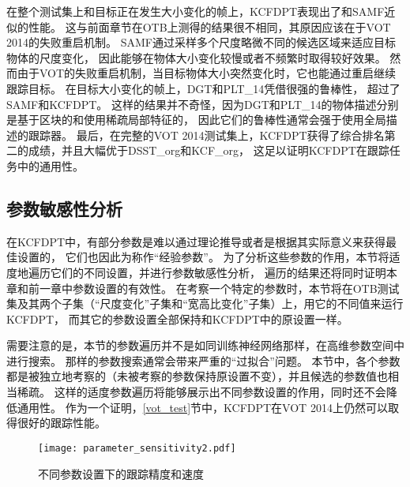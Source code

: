 在整个测试集上和目标正在发生大小变化的帧上，KCFDPT表现出了和SAMF近似的性能。
这与前面章节在OTB上测得的结果很不相同，其原因应该在于VOT 2014的失败重启机制。
SAMF通过采样多个尺度略微不同的候选区域来适应目标物体的尺度变化，
因此能够在物体大小变化较慢或者不频繁时取得较好效果。
然而由于VOT的失败重启机制，当目标物体大小突然变化时，它也能通过重启继续跟踪目标。
在目标大小变化的帧上，DGT和PLT\_14凭借很强的鲁棒性，
超过了SAMF和KCFDPT。
这样的结果并不奇怪，因为DGT和PLT\_14的物体描述分别是基于区块的和使用稀疏局部特征的，
因此它们的鲁棒性通常会强于使用全局描述的跟踪器。
最后，在完整的VOT 2014测试集上，KCFDPT获得了综合排名第二的成绩，并且大幅优于DSST\_org和KCF\_org，
这足以证明KCFDPT在跟踪任务中的通用性。

\subsection{参数敏感性分析}
\label{parameter-sensitivity}

在KCFDPT中，有部分参数是难以通过理论推导或者是根据其实际意义来获得最佳设置的，
它们也因此为称作``经验参数''。
为了分析这些参数的作用，本节将适度地遍历它们的不同设置，并进行参数敏感性分析，
遍历的结果还将同时证明本章和前一章中参数设置的有效性。
在考察一个特定的参数时，本节将在OTB测试集及其两个子集（``尺度变化''子集和``宽高比变化''子集）上，用它的不同值来运行KCFDPT，
而其它的参数设置全部保持和KCFDPT中的原设置一样。

需要注意的是，本节的参数遍历并不是如同训练神经网络那样，在高维参数空间中进行搜索。
那样的参数搜索通常会带来严重的``过拟合''问题。
本节中，各个参数都是被独立地考察的（未被考察的参数保持原设置不变），并且候选的参数值也相当稀疏。
这样的适度参数遍历将能够展示出不同参数设置的作用，同时还不会降低通用性。
作为一个证明，\ref{vot_test}节中，KCFDPT在VOT 2014上仍然可以取得很好的跟踪性能。

\begin{figure}[htbp]
\centering
		\texttt{[image: parameter\_sensitivity2.pdf]}
	\caption{不同参数设置下的跟踪精度和速度}
	\label{parameter_sensitivity}
\end{figure}

